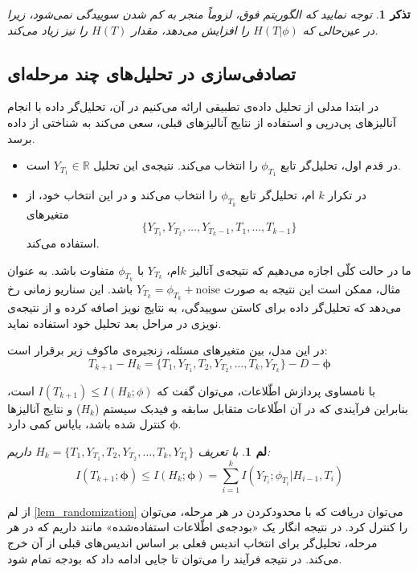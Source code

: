 \documentclass[a4paper,12pt]{article}
\newtheorem{lem}{{\large\bf لم}}[section]
\newtheorem{rem}{{\large\bf تذکر}}[section]
\newcommand{\bfphi}{\bm {\phi}}
\newcommand{\R}{\mathbb{R}}
\begin{document}
	\begin{rem}
		توجه نمایید که الگوریتم فوق، لزوماً منجر به کم شدن سوییدگی نمی‌شود، زیرا در عین‌حالی که 
		$H(T|\phi)$
		را افزایش می‌دهد، مقدار
		$H(T)$
		را نیز زیاد می‌کند.
	\end{rem}
	
	\subsection{تصادفی‌سازی در تحلیل‌های چند مرحله‌ای}
	
	
	در ابتدا مدلی از تحلیل داده‌ی تطبیقی ارائه می‌کنیم در آن، تحلیل‌گر داده با انجام آنالیز‌های پی‌در‌پی و استفاده از نتایج آنالیز‌های قبلی، سعی می‌کند به شناختی از داده برسد.
	\begin{itemize}
		\item
		در قدم اول، تحلیل‌گر تابع 
		$\phi_{T_1}$
		را انتخاب می‌کند. نتیجه‌ی این تحلیل 
		$Y_{T_1} \in \R$
		است.
		\item
		در تکرار 
		$k$ ام،
		تحلیل‌گر تابع 
		$\phi_{T_k}$
		را انتخاب می‌کند و در این انتخاب خود، از متغیر‌های
		$$\{Y_{T_1}, Y_{T_2}, \dots, Y_{T_k-1}, T_1, \dots, T_{k-1}\}$$
		استفاده می‌کند.
	\end{itemize}
	
	ما در حالت کلّی اجازه می‌دهیم که نتیجه‌ی آنالیز $k$ام،
	$Y_{T_k}$
	با 
	$\phi_{T_k}$
	متفاوت باشد. به عنوان مثال، ممکن است این نتیجه به صورت
	$Y_{T_k} = \phi_{T_k} + \text{noise}$
	باشد. این سناریو زمانی رخ می‌دهد که تحلیل‌گر داده برای کاستن سوییدگی، به نتایج نویز اصافه کرده و از نتیجه‌ی نویزی در مراحل بعد تحلیل خود استفاده نماید.
	
	در این مدل، بین متغیر‌های مسئله، زنجیره‌ی ماکوف زیر برقرار است:
	$$T_{k+1} - H_k = \{T_1, Y_{T_1}, T_2, Y_{T_2}, \dots, T_k, Y_{T_k}\} - D - \bfphi$$
	
	با نامساوی پردازش اطّلاعات، می‌توان گفت که
	$I(T_{k+1}) \leq I(H_k; \phi)$
	است، بنابراین فرآیندی که در آن اطّلاعات متقابل سابقه و فیدبک سیستم ($H_k$) و نتایج آنالیز‌ها
	$\bfphi$
	کنترل شده باشد، بایاس کمی دارد.
	
	\begin{lem}\label{lem_randomization}
		با تعریف
		$H_k = \{T_1, Y_{T_1}, T_2, Y_{T_2}, \dots, T_k, Y_{T_k}\}$
		داریم:
		$$I(T_{k+1} ; \bfphi) \leq I(H_k;\bfphi) = \sum_{i = 1}^{k} I(Y_{T_i};\phi_{T_i}| H_{i-1}, T_i)$$
	\end{lem}
	از لم
	\eqref{lem_randomization}
	می‌توان دریافت که با محدودکردن
	در هر مرحله، می‌توان 
	\lr{$I(T_{k+1} ; \bfphi)$}
	را کنترل کرد. در نتیجه انگار یک «بودجه‌ی اطّلاعات استفاده‌شده» مانند
	داریم که در هر مرحله، تحلیل‌گر برای انتخاب اندیس فعلی بر اساس اندیس‌های قبلی از آن خرج می‌کند. در نتیجه فرآیند را می‌توان تا جایی ادامه داد که بودجه تمام شود.
	
\end{document}
